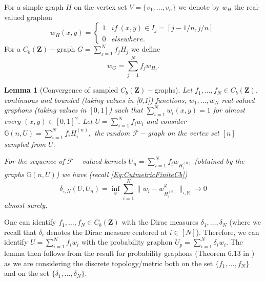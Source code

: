 \documentclass[11pt]{article}
\newtheorem{lemma}[theorem]{Lemma}
\def\R{\mathbb{R}}
\newcommand{\cF}{{\mathcal F}}  %
\newcommand{\Space}{\mathbf{Z}}
\newcommand{\CbFunct}{C_b(\Space)}
\newcommand{\NcutR}[1]{\Vert#1\Vert_{\square,\R}}
\begin{document}
For a simple graph $H$ on the vertex set $V=\{v_1,\ldots,v_n\}$ we denote by $w_H$ the real-valued graphon $$
w_H(x,y)=\begin{cases}
    1 & if \ (x,y)\in I_j=[j-1/n,j/n] \\
    0 & elsewhere.
\end{cases}
$$
For a $\CbFunct-$graph $G=\sum^N_{j=1}f_jH_j$ we define $$w_G=\sum^N_{j=1}f_jw_{H_j}.$$
\begin{lemma}[Convergence of sampled $\CbFunct-$graphs]\label{LemmSampledCbGraphsConvergeToKernel}
Let $f_1,\ldots,f_N\in \CbFunct,$ continuous and bounded (taking values in [0,1]) functions, $w_1,\ldots,w_N$ real-valued graphons (taking values in $[0,1]$) such that $\sum^N_{i=1}w_i(x,y)=1$ for almost every $(x,y)\in [0,1]^2.$ Let $U=\sum^N_{i=1}f_iw_i$ and consider $\mathbb{G}(n,U)=\sum^N_{i=1}f_iH_i^{(n)},$ the random $\cF-$graph on  the vertex set $[n]$ sampled from $U.$   



For the sequence of $\cF-$valued kernels $U_n=\sum^N_{i=1}f_iw_{H^{(n)}_i}$ (obtained by the graphs $\mathbb{G}(n,U)$) we have (recall \eqref{Eq:CutmetricFiniteCb})
\begin{equation*}
\delta_{\square,N}(U,U_n)=\inf_{\varphi}\sum^N_{i=1}\|w_i-w^{\varphi}_{H^{(n)}_i}\|_{\square,\R}\rightarrow 0
\end{equation*} almost surely.
\end{lemma}
\proof
One can identify $f_1,\ldots,f_N\in \CbFunct$ with the Dirac measures $\delta_1,\ldots,\delta_N$ (where we recall that $\delta_i$ denotes the Dirac measure centered at $i\in [N]$). Therefore, we can identify $U=\sum^N_{i=1}f_iw_i$ with the probability graphon $U_p=\sum^N_{i=1}\delta_iw_i.$ The lemma then follows from the result for probability graphons (Theorem 6.13 in \cite{abraham2023probabilitygraphons}) as we are considering the discrete topology/metric both on the set $\{f_1,\ldots,f_N\}$ and on the set  $\{\delta_1,\ldots,\delta_N\}$. 
\endproof
\end{document}
